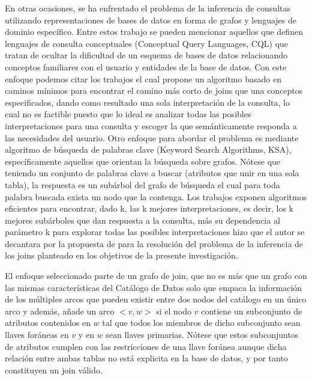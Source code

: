 En otras ocasiones, se ha enfrentado el problema de la inferencia de consultas utilizando representaciones
de bases de datos en forma de grafos y lenguajes 
de dominio específico. Entre estos trabajo se pueden mencionar aquellos que definen lenguajes de consulta 
conceptuales (Conceptual Query Languages, CQL) que tratan de ocultar la dificultad de un esquema de bases de 
datos relacionando conceptos familiares con el usuario y entidades de la base de datos. Con este enfoque 
podemos citar los trabajos \cite{owei2001enriching} el cual propone
un algoritmo basado en caminos mínimos para encontrar el camino m\'as corto de joins que una conceptos 
especificados, dando como resultado una sola interpretación de la consulta, lo cual no es factible 
puesto que lo ideal es analizar todas las posibles interpretaciones para una consulta y escoger la 
que sem\'anticamente responda a las necesidades del usuario. Otro enfoque para abordar el problema 
es mediante algoritmo de búsqueda de palabras clave (Keyword Search Algorithms, KSA), específicamente  
aquellos que orientan la búsqueda sobre grafos. Nótese que teniendo un conjunto de palabras clave 
a buscar (atributos que unir en una sola tabla), la respuesta es un sub\'arbol del grafo de búsqueda 
el cual para toda palabra buscada exista un nodo que la contenga. Los trabajos 
\cite{kimelfeld2006finding,hristidis2003efficient,he2007blinks} exponen algoritmos eficientes para 
encontrar, dado k, las k mejores interpretaciones, es decir, los k mejores sub\'arboles que dan respuesta 
a la consulta, m\'as su dependencia al parámetro k para explorar todas las posibles interpretaciones 
hizo que el autor se decantara por la propuesta de \cite{mason2005autojoin} para la resolución 
del problema de la inferencia de los joins planteado en los objetivos de la presente investigación.

El enfoque seleccionado parte de un grafo de join, que no es m\'as que un grafo con las mismas características 
del Catálogo de Datos solo que empaca la información de los múltiples arcos que pueden existir entre 
dos nodos del catálogo en un \'unico arco y además, añade un arco $<v, w>$ si el nodo $v$ contiene un subconjunto 
de atributos contenidos en $w$ tal que todos los miembros de dicho subconjunto sean llaves for\'aneas en $v$
y en $w$ sean llaves primarias. Nótese que estos subconjuntos de atributos cumplen con las restricciones 
de una llave for\'anea aunque dicha relación entre ambas tablas no est\'a explicita en la base de datos, 
y por tanto constituyen un join válido.

